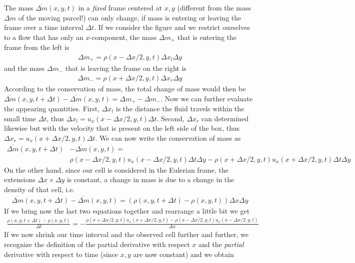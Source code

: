 \documentclass[10pt,a4paper]{article}
\begin{document}
The mass $\overline{\Delta m}(x,y,t)$ in a \textit{fixed} frame centered at $x,y$ (different from the mass $\Delta m$ of the moving parcel!) can only change, if mass is entering or leaving the frame over a time interval $\Delta t$.
%
If we consider the figure and we restrict ourselves to a flow that has only an $x$-component, the mass $\Delta m_+$ that is entering the frame from the left is
%
\begin{align}
\Delta m_+ = \rho(x-\Delta x/2, y, t) \Delta x_l \Delta y
\end{align}
%
and the mass $\Delta m_-$ that is leaving the frame on the right is
\begin{align}
\Delta m_- = \rho(x+\Delta x/2, y, t) \Delta x_r \Delta y
\end{align}
%
According to the conservation of mass, the total change of mass would then be $\overline{\Delta m}(x,y,t+\Delta t) - \overline{\Delta m}(x,y,t) = \Delta m_+ - \Delta m_- $.
%
Now we can further evaluate the appearing quantities.
%
First, $\Delta x_l$ is the distance the fluid travels within the small time $\Delta t$, thus
$\Delta x_l = u_x(x-\Delta x/2,y,t) \Delta t$.
%
Second, $\Delta x_r$ can determined likewise but with the velocity that is present on the left side of the box, thus $\Delta x_r = u_x(x+\Delta x/2,y,t) \Delta t$.
%
We can now write the conservation of mass as 
\begin{align}
 \overline{\Delta m}(x,y,t+\Delta t) & - \overline{\Delta m}(x,y,t) = \\ \nonumber
& \rho(x-\Delta x/2, y, t)  u_x(x-\Delta x/2,y,t) \Delta t \Delta y - \rho(x+\Delta x/2, y, t) u_x(x+\Delta x/2,y,t) \Delta t \Delta y
\end{align}
%
On the other hand, since our cell is considered in the Eulerian frame, the extensions $\Delta x \times \Delta y$ is constant, a change in mass is due to a change in the density of that cell, i.e.
%
\begin{align}
\overline{\Delta m}(x,y,t+\Delta t) - \overline{\Delta m}(x,y,t) = (\rho(x,y,t+\Delta t) - \rho(x,y,t))  \Delta x \Delta y
\end{align}
%
If we bring now the last two equations together and rearrange a little bit we get
%
\begin{align}
\frac{\rho(x,y,t+\Delta t) - \rho(x,y,t)}{\Delta t} = -\frac{\rho(x+\Delta x/2, y, t)  u_x(x+\Delta x/2,y,t)- \rho(x-\Delta x/2, y, t) u_x(x-\Delta x/2,y,t)}{\Delta x}  
\end{align}
%
If we now shrink our time interval and the observed cell further and further, we recognize the definition of the partial derivative with respect $x$ and the \textit{partial} derivative with respect to time (since $x,y$ are now constant) and we obtain
\end{document}

